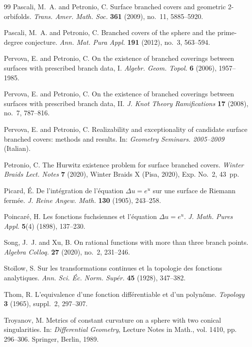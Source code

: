 \documentclass[microtype]{gtpart}     %
\theoremstyle{definition}
\begin{document}
\begin{thebibliography}{99}
Pascali, M.~A. and Petronio, C.
Surface branched covers and geometric 2-orbifolds.
\textit{Trans. Amer. Math. Soc.} \textbf{361} (2009), no.~11, 5885--5920.

Pascali, M.~A. and Petronio, C.
Branched covers of the sphere and the prime-degree conjecture.
\textit{Ann. Mat. Pura Appl.} \textbf{191} (2012), no.~3, 563--594.

Pervova, E. and Petronio, C.
On the existence of branched coverings between surfaces with prescribed branch data, I.
\textit{Algebr. Geom. Topol.} \textbf{6} (2006), 1957--1985.

Pervova, E. and Petronio, C.
On the existence of branched coverings between surfaces with prescribed branch data, II.
\textit{J. Knot Theory Ramifications} \textbf{17} (2008), no.~7, 787--816.

Pervova, E. and Petronio, C.
Realizability and exceptionality of candidate surface branched covers: methods and results.
In: \textit{Geometry Seminars. 2005--2009} (Italian).

Petronio, C.
The Hurwitz existence problem for surface branched covers.
\textit{Winter Braids Lect. Notes} \textbf{7} (2020), Winter Braids X (Pisa, 2020), Exp. No.~2, 43~pp.

Picard, \'E.
De l'int\'egration de l'\'equation $\Delta u=e^{u}$ sur une surface de Riemann ferm\'ee.
\textit{J. Reine Angew. Math.} \textbf{130} (1905), 243--258.

Poincar\'e, H.
Les fonctions fuchsiennes et l'\'equation $\Delta u=e^{u}$.
\textit{J. Math. Pures Appl.} \textbf{5}(4) (1898), 137--230.

Song, J.~J. and Xu, B.
On rational functions with more than three branch points.
\textit{Algebra Colloq.} \textbf{27} (2020), no.~2, 231--246.


Sto\"ilow, S.
Sur les transformations continues et la topologie des fonctions analytiques.
\textit{Ann. Sci. \'Ec. Norm. Sup\'er.} \textbf{45} (1928), 347--382.


Thom, R.
L'equivalence d'une fonction diff\'erentiable et d'un polyn\^ome.
\textit{Topology} \textbf{3} (1965), suppl.~2, 297--307.

Troyanov, M.
Metrics of constant curvature on a sphere with two conical singularities.
In: \textit{Differential Geometry}, Lecture Notes in Math., vol. 1410, pp. 296--306.
Springer, Berlin, 1989.


\end{thebibliography}
\end{document}
